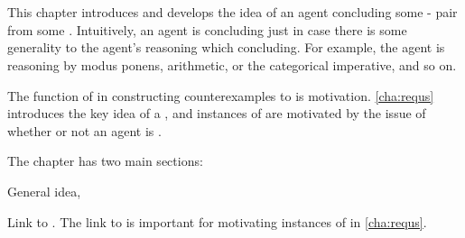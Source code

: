 \chapter{}
\label{cha:typical}
\nocite{Wilson:1994aa}
\nocite{Goodman:1983aa}

\begin{note}
  This chapter introduces and develops the idea of an agent \emph{\typeAdj{}} concluding some - pair from some \pool{}.
  Intuitively, an agent is \typeAdj{} concluding just in case there is some generality to the agent's reasoning which concluding.
  For example, the agent is reasoning by modus ponens, arithmetic, or the categorical imperative, and so on.

  The function of \tCV{} in constructing counterexamples to \issueConstraint{} is motivation.
  \autoref{cha:requs} introduces the key idea of a \requ{}, and instances of  are motivated by the issue of whether or not an agent is \tCV{}.
\end{note}

\begin{note}
  The chapter has two main sections:
  \begin{TOCEnum}
  \item

    General idea, 
  \item

    Link to .
    The link to  is important for motivating instances of \requ{} in \autoref{cha:requs}.
  \end{TOCEnum}
\end{note}



\section{}
\label{cha:typical:int}

